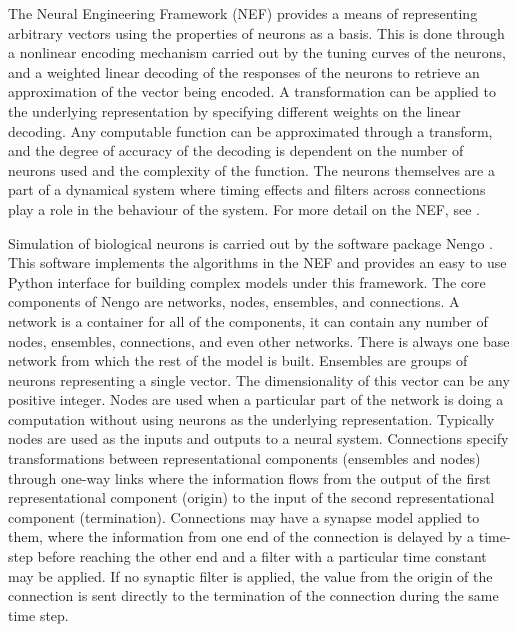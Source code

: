 \documentclass[letterpaper, 10 pt, conference]{ieeeconf}  %
\begin{document}
The Neural Engineering Framework (NEF)\cite{eliasmith2004neural} provides a means of representing arbitrary vectors using the properties of neurons as a basis.
This is done through a nonlinear encoding mechanism carried out by the tuning curves of the neurons, and a weighted linear decoding of the responses of the neurons to retrieve an approximation of the vector being encoded.
A transformation can be applied to the underlying representation by specifying different weights on the linear decoding.
Any computable function can be approximated through a transform, and the degree of accuracy of the decoding is dependent on the number of neurons used and the complexity of the function.
The neurons themselves are a part of a dynamical system where timing effects and filters across connections play a role in the behaviour of the system. 
For more detail on the NEF, see \cite{eliasmith2007build, stewart2011neural, eliasmith2013build}. %

Simulation of biological neurons is carried out by the software package Nengo \cite{bekolay2013nengo}.
This software implements the algorithms in the NEF and provides an easy to use Python interface for building complex models under this framework.
The core components of Nengo are networks, nodes, ensembles, and connections.
A network is a container for all of the components, it can contain any number of nodes, ensembles, connections, and even other networks.
There is always one base network from which the rest of the model is built.
Ensembles are groups of neurons representing a single vector. 
The dimensionality of this vector can be any positive integer.
Nodes are used when a particular part of the network is doing a computation without using neurons as the underlying representation.
Typically nodes are used as the inputs and outputs to a neural system.
Connections specify transformations between representational components (ensembles and nodes) through one-way links where the information flows from the output of the first representational component (origin) to the input of the second representational component (termination).
Connections may have a synapse model applied to them, where the information from one end of the connection is delayed by a time-step before reaching the other end and a filter with a particular time constant may be applied.
If no synaptic filter is applied, the value from the origin of the connection is sent directly to the termination of the connection during the same time step.
\end{document}
